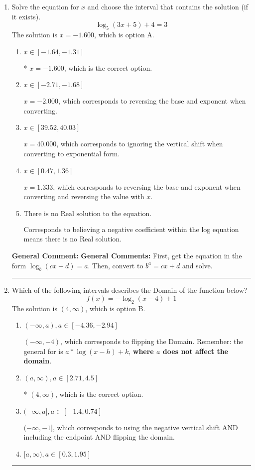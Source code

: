 \documentclass{extbook}[14pt]
\newcommand{\litem}[1]{\item #1

\rule{\textwidth}{0.4pt}}
\begin{document}
\begin{enumerate}\litem{
Solve the equation for $x$ and choose the interval that contains the solution (if it exists).
\[ \log_{5}{(3x+5)}+4 = 3 \]The solution is \( x = -1.600 \), which is option A.\begin{enumerate}[label=\Alph*.]
\item \( x \in [-1.64, -1.31] \)

* $x = -1.600$, which is the correct option.
\item \( x \in [-2.71, -1.68] \)

$x = -2.000$, which corresponds to reversing the base and exponent when converting.
\item \( x \in [39.52, 40.03] \)

$x = 40.000$, which corresponds to ignoring the vertical shift when converting to exponential form.
\item \( x \in [0.47, 1.36] \)

$x = 1.333$, which corresponds to reversing the base and exponent when converting and reversing the value with $x$.
\item \( \text{There is no Real solution to the equation.} \)

Corresponds to believing a negative coefficient within the log equation means there is no Real solution.
\end{enumerate}

\textbf{General Comment:} \textbf{General Comments:} First, get the equation in the form $\log_b{(cx+d)} = a$. Then, convert to $b^a = cx+d$ and solve.
}
\litem{
Which of the following intervals describes the Domain of the function below?
\[ f(x) = -\log_2{(x-4)}+1 \]The solution is \( (4, \infty) \), which is option B.\begin{enumerate}[label=\Alph*.]
\item \( (-\infty, a), a \in [-4.36, -2.94] \)

$(-\infty, -4)$, which corresponds to flipping the Domain. Remember: the general for is $a*\log(x-h)+k$, \textbf{where $a$ does not affect the domain}.
\item \( (a, \infty), a \in [2.71, 4.5] \)

* $(4, \infty)$, which is the correct option.
\item \( (-\infty, a], a \in [-1.4, 0.74] \)

$(-\infty, -1]$, which corresponds to using the negative vertical shift AND including the endpoint AND flipping the domain.
\item \( [a, \infty), a \in [0.3, 1.95] \)


\end{enumerate}}
\end{enumerate}
\end{document}
